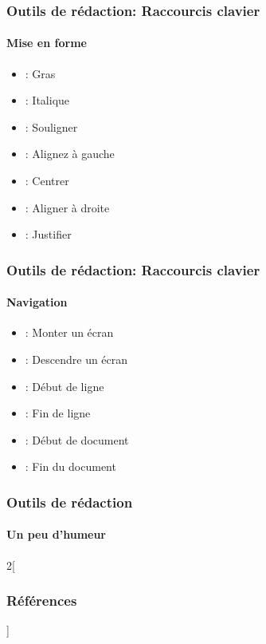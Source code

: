 \documentclass[xcolor=table]{beamer}
\begin{document}
\begin{frame}
\frametitle{Outils de rédaction: Raccourcis clavier}
\framesubtitle{Mise en forme}

\begin{itemize}
	\item {}: Gras
	\item {}: Italique
	\item {}: Souligner
	\item {}: Alignez à gauche
	\item {}: Centrer
	\item {}: Aligner à droite
	\item {}: Justifier 
\end{itemize}

\end{frame}

\begin{frame}
\frametitle{Outils de rédaction: Raccourcis clavier}
\framesubtitle{Navigation}

\begin{itemize}
	\item {}: Monter un écran
	\item {}: Descendre un écran
	\item {}: Début de ligne
	\item {}: Fin de ligne
	\item {}: Début de document
	\item {}: Fin du document 
\end{itemize}

\end{frame}

\begin{frame}
\frametitle{Outils de rédaction}
\framesubtitle{Un peu d'humeur}


\end{frame}

\nocite{*}
%
% 

\begin{multicols*}{2}[\frametitle{Références}]%
	\tiny
	
	
\end{multicols*}
\end{document}
